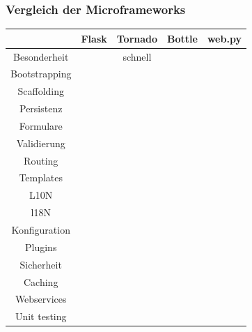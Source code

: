 \documentclass[
    t,
    smaller,
    compress,
    xcolor=svgnames,            %
    table,
]{beamer}
\begin{document}
\begin{frame}
  \frametitle{Vergleich der Microframeworks}

  \vspace{-8pt}
    \begin{table}[h]
        \begin{tabular}{|c|c|c|c|c|}
            \hline
                          & Flask & Tornado & Bottle & web.py \\ \hline \hline
            Besonderheit  &   &  schnell  &   &      \\ \hline \hline
            Bootstrapping &   &   &   &      \\ \hline
            Scaffolding   &   &   &   &      \\ \hline
            Persistenz    &   &   &   &      \\ \hline
            Formulare     &   &   &   &      \\ \hline
            Validierung   &   &   &   &      \\ \hline
            Routing       &   &   &   &      \\ \hline
            Templates     &   &   &   &      \\ \hline
            L10N          &   &   &   &      \\ \hline
            l18N          &   &   &   &      \\ \hline
            Konfiguration &   &   &   &      \\ \hline
            Plugins       &   &   &   &      \\ \hline
            Sicherheit    &   &   &   &      \\ \hline
            Caching       &   &   &   &      \\ \hline
            Webservices   &   &   &   &      \\ \hline
            Unit testing  &   &   &   &      \\ \hline
         \end{tabular}
    \end{table}

\end{frame}
\end{document}
